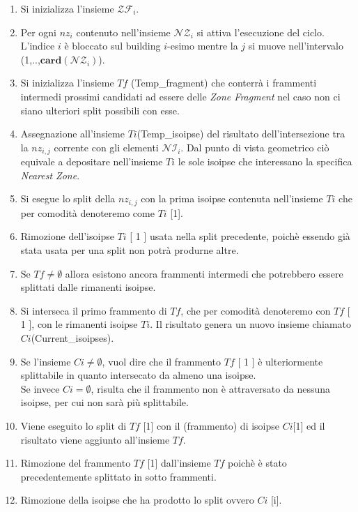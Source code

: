 \begin{enumerate}
	\item Si inizializza l'insieme $\mathcal{ZF}_i$.
	\item Per ogni $nz_i$ contenuto nell'insieme $\mathcal{NZ}_i$ si attiva l'esecuzione del ciclo. L'indice $i$ è bloccato sul building $i$-esimo mentre la $j$ si muove nell'intervalo (1,..,$\mathbf{card}(\mathcal{NZ}_i)$).
	\item Si inizializza l'insieme $Tf$ (Temp\_fragment) che conterrà i frammenti intermedi prossimi candidati ad essere delle \textit{Zone Fragment} nel caso non ci siano ulteriori split possibili con esse.
	\item Assegnazione all'insieme $Ti$(Temp\_isoipse) del risultato dell'intersezione tra la $nz_{i,j}$ corrente con gli elementi $\mathcal{NI}_i$. Dal punto di vista geometrico ciò equivale a depositare nell'insieme $Ti$ le sole isoipse che interessano la specifica \textit{Nearest Zone}. 
	\item Si esegue lo split della $nz_{i,j}$ con la prima isoipse contenuta nell'insieme $Ti$ che per comodità denoteremo come $Ti$ [1].
	\item Rimozione dell'isoipse $Ti$ [ 1 ] usata nella split precedente, poichè essendo già stata usata per una split non potrà produrne altre.
	\item Se $Tf \not=\emptyset$ allora esistono ancora frammenti intermedi che potrebbero essere splittati dalle rimanenti isoipse.
	\item Si interseca il primo frammento di $Tf$, che per comodità denoteremo con $Tf$ [ 1 ], con le rimanenti isoipse $Ti$. Il risultato genera un nuovo insieme chiamato $Ci$(Current\_isoipses).
	\item Se l'insieme $Ci \not=\emptyset$, vuol dire che il frammento $Tf$ [ 1 ] è ulteriormente splittabile in quanto intersecato da almeno una isoipse.
	\\
	Se invece $Ci =\emptyset$, risulta che il frammento non è attraversato da nessuna isoipse, per cui non sarà più splittabile.
	\item Viene eseguito lo split di $Tf$ [1] con il (frammento) di isoipse $Ci$[1] ed il risultato viene aggiunto all'insieme $Tf$.
	\item Rimozione del frammento $Tf$ [1] dall'insieme $Tf$ poichè è stato precedentemente splittato in sotto frammenti.
	\item Rimozione della isoipse che ha prodotto lo split ovvero $Ci$ [i].
\end{enumerate}
